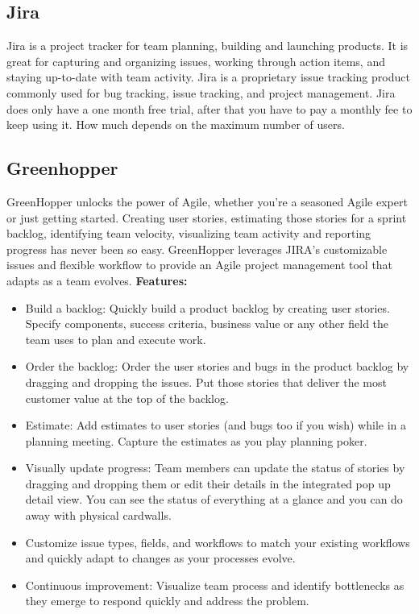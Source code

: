 \subsection{Jira}
Jira is a project tracker for team planning, building and launching products. It is great for capturing and organizing issues, working through action items, and staying up-to-date with team activity. Jira is a proprietary issue tracking product commonly used for bug tracking, issue tracking, and project management.
\newline
\newline
Jira does only have a one month free trial, after that you have to pay a monthly fee to keep using it. How much depends on the maximum number of users.

\subsection{Greenhopper}
GreenHopper unlocks the power of Agile, whether you're a seasoned Agile expert or just getting started. Creating user stories, estimating those stories for a sprint backlog, identifying team velocity, visualizing team activity and reporting progress has never been so easy.
\newline
\newline
GreenHopper leverages JIRA's customizable issues and flexible workflow to provide an Agile project management tool that adapts as a team evolves.
\newline
\newline
\textbf{Features:}
\begin{itemize}
\item{}Build a backlog: Quickly build a product backlog by creating user stories. Specify components, success criteria, business value or any other field the team uses to plan and execute work.
\item{}Order the backlog: Order the user stories and bugs in the product backlog by dragging and dropping the issues. Put those stories that deliver the most customer value at the top of the backlog.
\item{}Estimate: Add estimates to user stories (and bugs too if you wish) while in a planning meeting. Capture the estimates as you play planning poker.
\item{}Visually update progress: Team members can update the status of stories by dragging and dropping them or edit their details in the integrated pop up detail view. You can see the status of everything at a glance and you can do away with physical cardwalls.
\item{}Customize issue types, fields, and workflows to match your existing workflows and quickly adapt to changes as your processes evolve.
\item{}Continuous improvement: Visualize team process and identify bottlenecks as they emerge to respond quickly and address the problem.
\end{itemize}